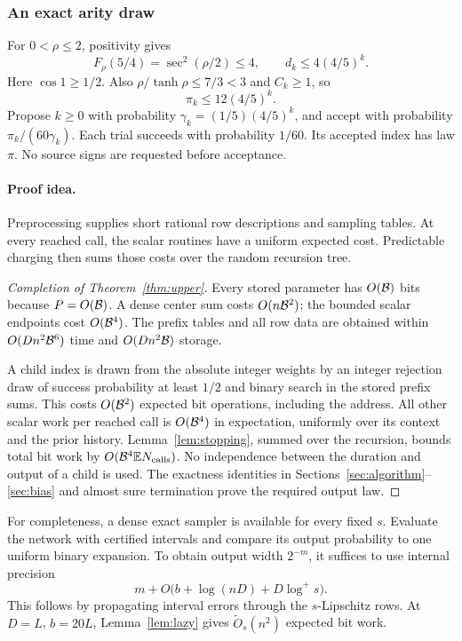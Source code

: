 \subsubsection{An exact arity draw}

For \(0<\rho\le2\), positivity gives
\[
F_\rho(5/4)=\sec^2(\rho/2)\le4,\qquad
d_k\le4(4/5)^k.
\]
Here \(\cos1\ge1/2\).
Also \(\rho/\tanh\rho\le7/3<3\) and \(C_k\ge1\), so
\begin{equation}\label{eq:arityenvelope}
\pi_k\le12(4/5)^k.
\end{equation}
Propose \(k\ge0\) with probability
\(\gamma_k=(1/5)(4/5)^k\), and accept with probability
\(\pi_k/(60\gamma_k)\). Each trial succeeds with probability
\(1/60\). Its accepted index has law \(\pi\).
No source signs are requested before acceptance.



\paragraph{Proof idea.}
Preprocessing supplies short rational row descriptions and sampling tables.
At every reached call, the scalar routines have a uniform expected cost.
Predictable charging then sums those costs over the random recursion tree.

\begin{proof}[Completion of Theorem~\ref{thm:upper}]
Every stored parameter has \(O(\mathcal B)\) bits because
\(P=O(\mathcal B)\). A dense center sum costs \(O(n\mathcal B^2)\);
the bounded scalar endpoints cost \(O(\mathcal B^4)\).
The prefix tables and all row data are obtained within
\(O(Dn^2\mathcal B^6)\) time and \(O(Dn^2\mathcal B)\) storage.

A child index is drawn from the absolute integer weights by an
integer rejection draw of success probability at least \(1/2\)
and binary search in the stored prefix sums. This costs
\(O(\mathcal B^2)\) expected bit operations, including the address.
All other scalar work per reached call is
\(O(\mathcal B^4)\) in expectation, uniformly over its context
and the prior history. Lemma~\ref{lem:stopping}, summed over the
recursion, bounds total bit work by
\(O(\mathcal B^4\mathbb E N_{\rm calls})\).
No independence between the duration and output of a child is used.
The exactness identities in Sections~\ref{sec:algorithm}--\ref{sec:bias}
and almost sure termination prove the required output law.
\end{proof}

For completeness, a dense exact sampler is available for every fixed
\(s\). Evaluate the network with certified intervals and compare its
output probability to one uniform binary expansion.
To obtain output width \(2^{-m}\), it suffices to use internal
precision
\[
m+O\bigl(b+\log(nD)+D\log^+s\bigr).
\]
This follows by propagating interval errors through the
\(s\)-Lipschitz rows. At \(D=L\), \(b=20L\), Lemma~\ref{lem:lazy}
gives \(\widetilde O_s(n^2)\) expected bit work.
